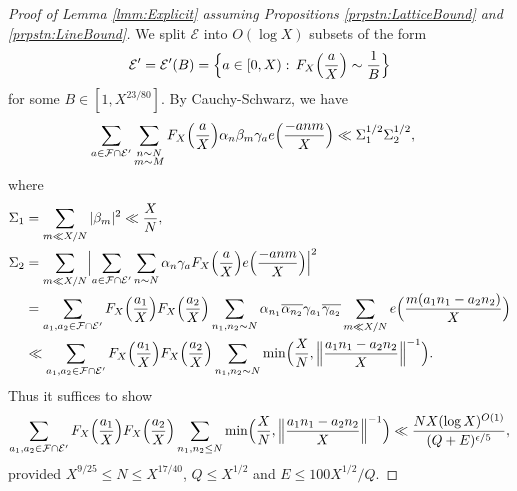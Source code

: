 \documentclass[10pt]{amsart}
\theoremstyle{plain}
\numberwithin{sblmm}{thrm}
\numberwithin{equation}{section}
\begin{document}
\begin{proof}[Proof of Lemma \ref{lmm:Explicit} assuming Propositions \ref{prpstn:LatticeBound} and \ref{prpstn:LineBound}]
We split $\mathcal{E}$ into $O(\log{X})$ subsets of the form
\[
\mathcal{E}'=\mathcal{E}'(B)=\Bigl\{a\in[0,X):\,F_X\Bigl(\frac{a}{X}\Bigr)\sim \frac{1}{B}\Bigr\}
\]
for some $B\in [1,X^{23/80}]$. By Cauchy-Schwarz, we have
%
\begin{align*}
\sum_{a\in\mathcal{F}\cap\mathcal{E}'}\sum_{\substack{n\sim N\\ m\sim M}}F_{X}\Bigl(\frac{a}{X}\Bigr)\alpha_n\beta_m\gamma_a e\Bigl(\frac{-a nm}{X}\Bigr)&\ll \Sigma_1^{1/2}\Sigma_2^{1/2},
\end{align*}
%
where
%
\begin{align*}
\Sigma_1&=\sum_{m\ll  X/N}|\beta_m|^2\ll \frac{X}{N},\\
\Sigma_2&=\sum_{m\ll X/N}\Bigl|\sum_{a\in\mathcal{F}\cap\mathcal{E}'}\sum_{n\sim N}\alpha_n \gamma_a F_{X}\Bigl(\frac{a}{X}\Bigr)e\Bigl(\frac{-a n m}{X}\Bigr)\Bigr|^2\\
&= \sum_{a_1,a_2\in\mathcal{F}\cap\mathcal{E}'}F_{X}\Bigl(\frac{a_1}{X}\Bigr)F_{X}\Bigl(\frac{a_2}{X}\Bigr)\sum_{n_1,n_2\sim N}\alpha_{n_1}\overline{\alpha_{n_2}}\gamma_{a_1}\overline{\gamma_{a_2}}\sum_{m\ll  X/N}e\Bigl(\frac{m(a_1n_1-a_2n_2)}{X}\Bigr)\\
&\ll \sum_{a_1,a_2\in\mathcal{F}\cap\mathcal{E}'}F_X\Bigl(\frac{a_1}{X}\Bigr)F_X\Bigl(\frac{a_2}{X}\Bigr)\sum_{n_1,n_2\sim N}\min\Bigl(\frac{X}{N},\Bigl\|\frac{a_1n_1-a_2n_2}{X}\Bigr\|^{-1}\Bigr).
\end{align*}
%
Thus it suffices to show
\[
\sum_{a_1,a_2\in\mathcal{F}\cap\mathcal{E}'}F_X\Bigl(\frac{a_1}{X}\Bigr)F_X\Bigl(\frac{a_2}{X}\Bigr)\sum_{n_1,n_2\le N}\min\Bigl(\frac{X}{N},\Bigl\|\frac{a_1n_1-a_2n_2}{X}\Bigr\|^{-1}\Bigr)\ll  \frac{N X(\log{X})^{O(1)}}{(Q+E)^{\epsilon/5}},
\]
provided $X^{9/25}\le N\le X^{17/40}$, $Q\le X^{1/2}$ and $E\le 100X^{1/2}/Q$.


\end{proof}
\end{document}
